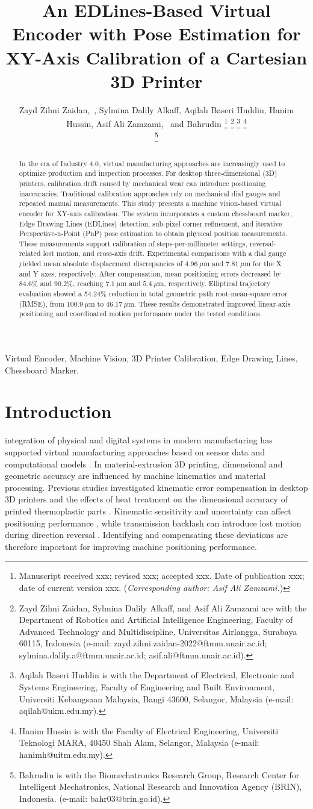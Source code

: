 \documentclass[journal]{IEEEtran}
\title{An EDLines-Based Virtual Encoder with Pose Estimation
for XY-Axis Calibration of a Cartesian 3D Printer}
\author{
Zayd Zihni Zaidan,~\IEEEmembership{Member,~IEEE},
Sylmina Dalily Alkaff,
Aqilah Baseri Huddin,
Hanim Hussin,
Asif Ali Zamzami,~\IEEEmembership{Member,~IEEE}
and Bahrudin
%
\thanks{Manuscript received xxx; revised xxx; accepted xxx. Date of publication xxx; date of current version xxx. (\textit{Corresponding author: Asif Ali Zamzami.})}
%
\thanks{Zayd Zihni Zaidan, Sylmina Dalily Alkaff, and Asif Ali Zamzami are with the Department of Robotics and Artificial Intelligence Engineering, Faculty of Advanced Technology and Multidiscipline, Universitas Airlangga, Surabaya 60115, Indonesia (e-mail: zayd.zihni.zaidan-2022@ftmm.unair.ac.id; sylmina.dalily.a@ftmm.unair.ac.id; asif.ali@ftmm.unair.ac.id).}
%
\thanks{Aqilah Baseri Huddin is with the Department of Electrical, Electronic and Systems Engineering, Faculty of Engineering and Built Environment, Universiti Kebangsaan Malaysia, Bangi 43600, Selangor, Malaysia (e-mail: aqilah@ukm.edu.my).}
%
\thanks{Hanim Hussin is with the Faculty of Electrical Engineering, Universiti Teknologi MARA, 40450 Shah Alam, Selangor, Malaysia (e-mail: hanimh@uitm.edu.my).}

\thanks{Bahrudin is with the Biomechatronics Research Group, Research Center for Intelligent Mechatronics, National Research and Innovation Agency (BRIN), Indonesia. (e-mail: bahr03@brin.go.id).}
}
\begin{document}
\maketitle

\begin{abstract}
In the era of Industry 4.0, virtual manufacturing
approaches are increasingly used to optimize production
and inspection processes. For desktop three-dimensional
(3D) printers, calibration drift caused by mechanical
wear can introduce positioning inaccuracies.
Traditional calibration approaches rely on mechanical
dial gauges and repeated manual measurements.
This study presents a machine vision-based virtual
encoder for XY-axis calibration.
The system incorporates a custom chessboard marker,
Edge Drawing Lines (EDLines) detection, sub-pixel corner
refinement, and iterative Perspective-n-Point (PnP)
pose estimation to obtain physical position measurements.
These measurements support calibration of
steps-per-millimeter settings, reversal-related lost
motion, and cross-axis drift.
Experimental comparisons with a dial gauge yielded
mean absolute displacement discrepancies of
$4.96~\mu\text{m}$ and $7.81~\mu\text{m}$ for the
X and Y axes, respectively.
After compensation, mean positioning errors decreased
by 84.6\% and 90.2\%, reaching $7.1~\mu\text{m}$
and $5.4~\mu\text{m}$, respectively.
Elliptical trajectory evaluation showed a 54.24\%
reduction in total geometric path root-mean-square
error (RMSE), from $100.9~\mu\text{m}$ to
$46.17~\mu\text{m}$.
These results demonstrated improved linear-axis
positioning and coordinated motion performance
under the tested conditions.
\end{abstract}

\begin{IEEEkeywords}
Virtual Encoder, Machine Vision, 3D Printer Calibration, Edge Drawing Lines, Chessboard Marker.
\end{IEEEkeywords}

\IEEEpeerreviewmaketitle

\section{Introduction}
 integration of physical and digital
systems in modern manufacturing has supported
virtual manufacturing approaches based on sensor
data and computational models \cite{soori2024}.
In material-extrusion 3D printing, dimensional and
geometric accuracy are influenced by machine
kinematics and material processing.
Previous studies investigated kinematic error
compensation in desktop 3D printers
\cite{keaveney2018} and the effects of heat treatment
on the dimensional accuracy of printed thermoplastic
parts \cite{ahmadshah2024}.
Kinematic sensitivity and uncertainty can affect
positioning performance \cite{xu2020}, while
transmission backlash can introduce lost motion
during direction reversal \cite{papageorgiou2019}.
Identifying and compensating these deviations
are therefore important for improving machine
positioning performance.
\end{document}
